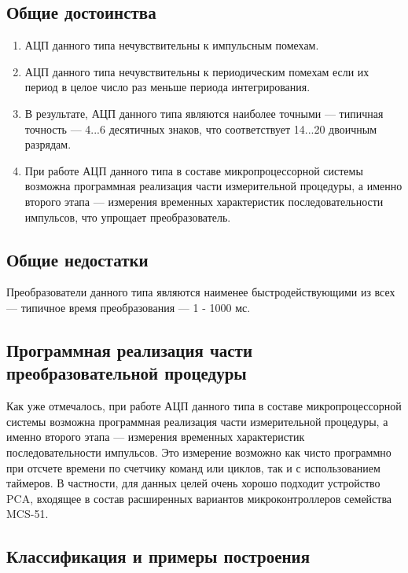 \subsection*{Общие достоинства}

\begin{enumerate}
\item АЦП данного типа нечувствительны к импульсным помехам.
\item АЦП данного типа нечувствительны к периодическим помехам если их период в целое число раз меньше периода интегрирования.
\item В результате, АЦП данного типа являются наиболее точными --- типичная точность --- 4...6 десятичных знаков, что соответствует 14...20 двоичным разрядам.
\item При работе АЦП данного типа в составе микропроцессорной системы возможна программная реализация части измерительной процедуры, а именно второго этапа --- измерения временных характеристик последовательности импульсов, что упрощает преобразователь.
\end{enumerate}

\subsection*{Общие недостатки}

Преобразователи данного типа являются наименее быстродействующими из всех --- типичное время преобразования --- 1 - 1000 мс.

\subsection*{Программная реализация части преобразовательной процедуры}

Как уже отмечалось, при работе АЦП данного типа в составе микропроцессорной системы возможна программная реализация части измерительной процедуры, а именно второго этапа --- измерения временных характеристик последовательности импульсов. Это измерение возможно как чисто программно при отсчете времени по счетчику команд или циклов, так и с использованием таймеров. В частности, для данных целей очень хорошо подходит устройство PCA, входящее в состав расширенных вариантов микроконтроллеров семейства MCS-51.

\subsection*{Классификация и примеры построения}

